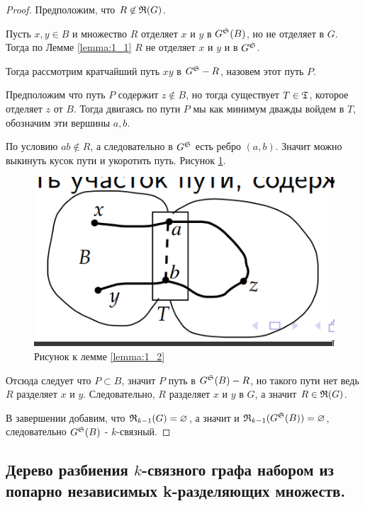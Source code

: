 \begin{proof}

	Предположим, что $R \not \in \R(G)$.

	Пусть $x, y \in B$ и множество  $R$ отделяет $x$ и $y$ в $G^\S(B)$, но не отделяет в $G$.
	Тогда по Лемме \ref{lemma:1_1} $R$ не отделяет $x$ и $y$ и в $G^\S$.

	Тогда рассмотрим кратчайший путь  $xy$ в $G^\S - R$, назовем этот путь $P$.

	Предположим что путь $P$ содержит $z \not \in B$, но тогда существует $T \in \T$, которое отделяет $z$ от $B$.
	Тогда двигаясь по пути $P$ мы как минимум дважды войдем в $T$, обозначим эти вершины $a, b$.

	По условию $ab \not \in R$, а следовательно в $G^\S$ есть ребро $(a,b)$.
	Значит можно выкинуть кусок пути и укоротить путь.
	Рисунок \ref{fig:lemma_1_2}.

\begin{figure}[ht]
    \centering
	\includegraphics[width=0.3\columnwidth]{figures/lemma_1_2.png}
    \caption{Рисунок к лемме \ref{lemma:1_2}}
    \label{fig:lemma_1_2}
\end{figure}

	Отсюда следует что $P \subset B$, значит $P$ путь в  $G^\S(B) - R$, но такого пути нет ведь $R$ разделяет $x$ и $y$.
	Следовательно, $R$ разделяет  $x$ и  $y$ в $G$, а значит $R \in \R(G)$.

	В завершении добавим, что $\R_{k-1}(G) = \varnothing$, а значит и  $\R_{k - 1}(G^\S(B)) = \varnothing$, следовательно $G^\S(B)$ - $k$-связный.
	
\end{proof}

\subsection{Дерево разбиения $k$-связного графа набором из попарно независимых k-разделяющих множеств.}

